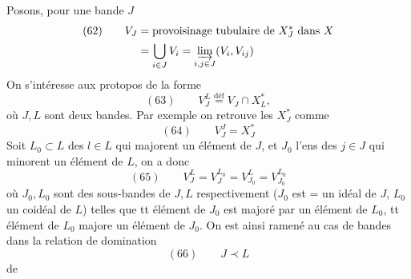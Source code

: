 

Posons, pour une bande $J$
\[
\begin{aligned}
(62)\qquad V_J&=\text{provoisinage tubulaire de }X_J^*\text{ dans }X\\
&=\bigcup_{i\in J}V_i=\varinjlim_{i,j\in J}(V_i,V_{ij})
\end{aligned}
\]
On s'intéresse aux protopos de la forme
\[
(63)\qquad V_J^L\overset{\mathrm{déf}}{=}V_J\cap X_L^*,
\]
où $J,L$ sont deux bandes. Par exemple on retrouve les $X_J^*$ comme
\[
(64)\qquad V_J^J=X_J^*
\]
Soit $L_0\subset L$  des $l\in L$ qui majorent un élément de $J$, et $J_0$ l'ens des $j\in J$ qui minorent un élément de $L$, on a donc
\[
(65)\qquad V_J^L=V_J^{L_0}=V_{J_0}^L=V_{J_0}^{L_0}
\]
où $J_0,L_0$ sont des sous-bandes de $J,L$ respectivement ($J_0$ est = un idéal de $J$, $L_0$ un coidéal de $L$) telles que tt élément de $J_0$ est majoré par un élément de $L_0$, tt élément de $L_0$ majore un élément de $J_0$. On est ainsi ramené au cas de bandes dans la relation de domination
\[
(66)\qquad J\prec L
\]
de
